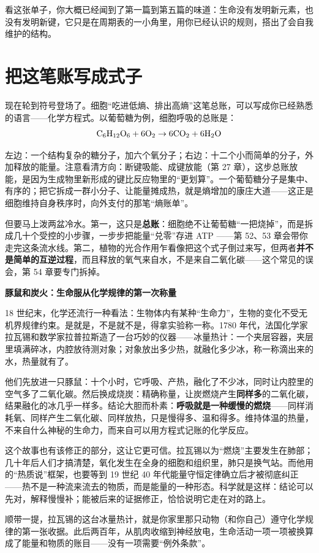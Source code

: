 看这张单子，你大概已经闻到了第一篇到第五篇的味道：生命没有发明新元素，也没有发明新键，它只是在周期表的一小角里，用你已经认识的规则，搭出了会自我维护的结构。

\section{把这笔账写成式子}

现在轮到符号登场了。细胞“吃进低熵、排出高熵”这笔总账，可以写成你已经熟悉的语言——化学方程式。以葡萄糖为例，细胞呼吸的总账是：
\[\mathrm{C_6H_{12}O_6} + \mathrm{6O_2} \rightarrow \mathrm{6CO_2} + \mathrm{6H_2O}\]

左边：一个结构复杂的糖分子，加六个氧分子；右边：十二个小而简单的分子，外加释放的能量。注意看清方向：断键吸能、成键放能（第 27 章），这步总账放能，是因为生成物里新形成的键比反应物里的“更划算”。一个葡萄糖分子是集中、有序的；把它拆成一群小分子、让能量摊成热，就是熵增加的康庄大道——这正是细胞维持自身秩序时，向外支付的那笔“熵账单”。

但要马上泼两盆冷水。第一，这只是\textbf{总账}：细胞绝不让葡萄糖“一把烧掉”，而是拆成几十个受控的小步骤，一步步把能量“兑零”存进 ATP ——第 52、53 章会带你走完这条流水线。第二，植物的光合作用乍看像把这个式子倒过来写，但两者\textbf{并不是简单的互逆过程}，而且释放的氧气来自水，不是来自二氧化碳——这个常见的误会，第 54 章要专门拆掉。

\begin{zhengju}
\textbf{豚鼠和炭火：生命服从化学规律的第一次称量}

18 世纪末，化学还流行一种看法：生物体内有某种“生命力”，生物的变化不受无机界规律约束。是就是，不是就不是，得拿实验称一称。1780 年代，法国化学家拉瓦锡和数学家拉普拉斯造了一台巧妙的仪器——冰量热计：一个夹层容器，夹层里填满碎冰，内腔放待测对象；对象放出多少热，就融化多少冰，称一称滴出来的水，热量就有了。

他们先放进一只豚鼠：十个小时，它呼吸、产热，融化了不少冰，同时让内腔里的空气多了二氧化碳。然后换成烧炭：精确称量，让炭燃烧产生\textbf{同样多}的二氧化碳，结果融化的冰几乎一样多。结论大胆而朴素：\textbf{呼吸就是一种缓慢的燃烧}——同样消耗氧、同样产生二氧化碳、同样放热，只是慢得多、温和得多。维持体温的热量，不来自什么神秘的生命力，而来自可以用方程式记账的化学反应。

这个故事也有该修正的部分，这让它更可信。拉瓦锡以为“燃烧”主要发生在肺部；几十年后人们才搞清楚，氧化发生在全身的细胞和组织里，肺只是换气站。而他用的“热质说”框架，也要等到 19 世纪 40 年代能量守恒定律确立后才被彻底纠正——热不是一种流来流去的物质，而是能量的一种形态。科学就是这样：结论可以先对，解释慢慢补；能被后来的证据修正，恰恰说明它走在对的路上。

顺带一提，拉瓦锡的这台冰量热计，就是你家里那只动物（和你自己）遵守化学规律的第一张收据。此后两百年，从肌肉收缩到神经放电，生命活动一项一项被换算成了能量和物质的账目——没有一项需要“例外条款”。
\end{zhengju}

